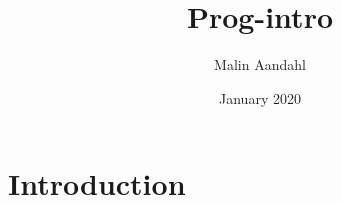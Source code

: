 \documentclass{article}
\title{Prog-intro}
\author{Malin Aandahl}
\date{January 2020}
\begin{document}
\maketitle

\section{Introduction}
\end{document}
